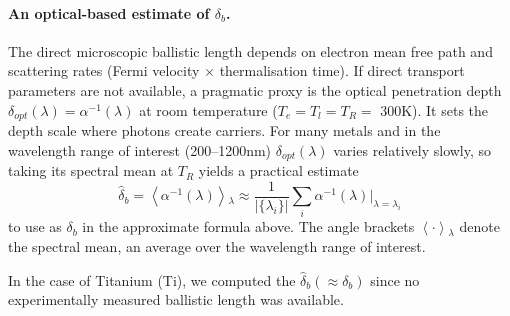\paragraph{An optical-based estimate of $\delta_b$.}
The direct microscopic ballistic length depends on electron mean free path and scattering rates
(Fermi velocity $\times$ thermalisation time). If direct transport parameters are not available,
a pragmatic proxy is the optical penetration depth $\delta_{opt}(\lambda) = \alpha^{-1}(\lambda)$ at room temperature ($T_e = T_l = T_R =$ 300K). It sets the depth scale where photons create carriers.
For many metals and in the wavelength range of interest (200--1200nm) $\delta_{opt}(\lambda)$ varies relatively slowly, so taking its spectral mean at $T_R$ yields a practical estimate
\begin{equation}
  \hat{\delta}_b =  \left\langle \alpha^{-1}(\lambda) \right\rangle{_\lambda} \approx \frac{1}{|\{\lambda_i\}|} \sum_i \alpha^{-1}(\lambda)\vert_{\lambda=\lambda_i}
  \label{eq:ch1-estimate_ballistic_length}
\end{equation}
to use as $\delta_b$ in the approximate formula above.
The angle brackets $\left\langle \cdot \right\rangle{_\lambda}$ denote the spectral mean, an average over the wavelength range of interest.

In the case of Titanium (Ti), we computed the $\hat{\delta}_b (\approx \delta_b)$ since no experimentally measured ballistic length was available.

